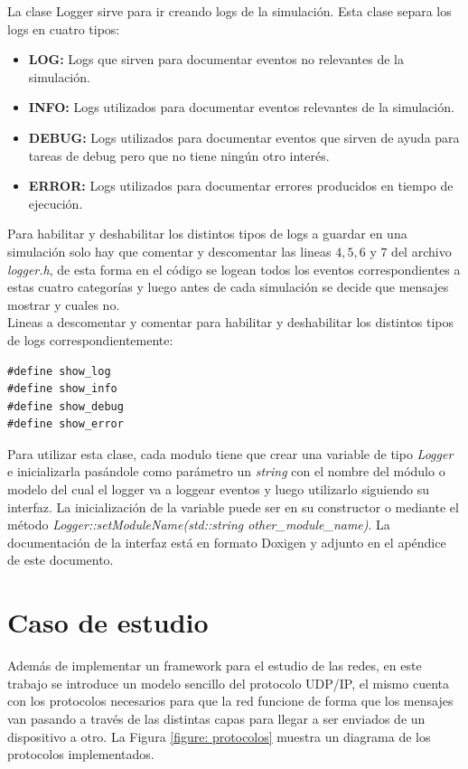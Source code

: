 \documentclass[10pt,a4paper]{article}
\begin{document}
La clase Logger sirve para ir creando logs de la simulación. Esta clase separa los logs en cuatro tipos:

\begin{itemize}
\item \textbf{LOG:} Logs que sirven para documentar eventos no relevantes de la simulación.
\item \textbf{INFO:} Logs utilizados para documentar eventos relevantes de la simulación.
\item \textbf{DEBUG:} Logs utilizados para documentar eventos que sirven de ayuda para tareas de debug pero que no tiene ningún otro interés.
\item \textbf{ERROR:} Logs utilizados para documentar errores producidos en tiempo de ejecución.
\end{itemize}

Para habilitar y deshabilitar los distintos tipos de logs a guardar en una simulación solo hay que comentar y descomentar las lineas $4,5,6$ y $7$ del archivo \textit{logger.h}, de esta forma en el código se logean todos los eventos correspondientes a estas cuatro categorías y luego antes de cada simulación se decide que mensajes mostrar y cuales no. \\

Lineas a descomentar y comentar para habilitar y deshabilitar los distintos tipos de logs correspondientemente:
\begin{lstlisting}
#define show_log
#define show_info
#define show_debug
#define show_error
\end{lstlisting}

Para utilizar esta clase, cada modulo tiene que crear una variable de tipo \textit{Logger} e inicializarla pasándole como parámetro un \textit{string} con el nombre del módulo o modelo del cual el logger va a loggear eventos y luego utilizarlo siguiendo su interfaz. La inicialización de la variable puede ser en su constructor o mediante el método \textit{Logger::setModuleName(std::string other\_module\_name)}. La documentación de la interfaz está en formato Doxigen y adjunto en el apéndice de este documento. \\

\section{Caso de estudio}
	Además de implementar un framework para el estudio de las redes, en este trabajo se introduce un modelo sencillo del protocolo UDP/IP, el mismo cuenta con los protocolos necesarios para que la red funcione de forma que los mensajes van pasando a través de las distintas capas para llegar a ser enviados de un dispositivo a otro. La Figura \ref{figure: protocolos} muestra un diagrama de los protocolos implementados. \\
\end{document}
